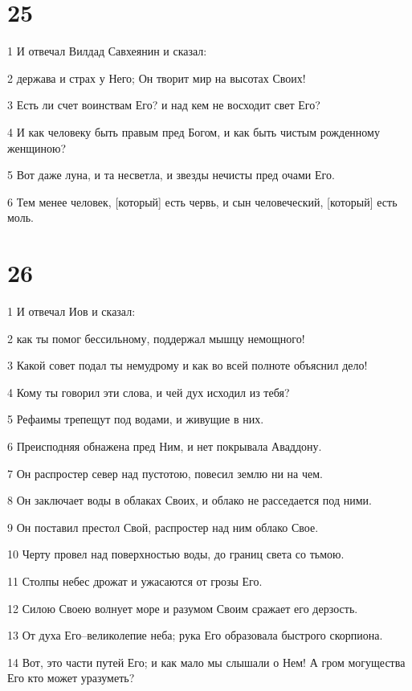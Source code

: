 \chapter{25}

\par 1 И отвечал Вилдад Савхеянин и сказал:
\par 2 держава и страх у Него; Он творит мир на высотах Своих!
\par 3 Есть ли счет воинствам Его? и над кем не восходит свет Его?
\par 4 И как человеку быть правым пред Богом, и как быть чистым рожденному женщиною?
\par 5 Вот даже луна, и та несветла, и звезды нечисты пред очами Его.
\par 6 Тем менее человек, [который] есть червь, и сын человеческий, [который] есть моль.

\chapter{26}

\par 1 И отвечал Иов и сказал:
\par 2 как ты помог бессильному, поддержал мышцу немощного!
\par 3 Какой совет подал ты немудрому и как во всей полноте объяснил дело!
\par 4 Кому ты говорил эти слова, и чей дух исходил из тебя?
\par 5 Рефаимы трепещут под водами, и живущие в них.
\par 6 Преисподняя обнажена пред Ним, и нет покрывала Аваддону.
\par 7 Он распростер север над пустотою, повесил землю ни на чем.
\par 8 Он заключает воды в облаках Своих, и облако не расседается под ними.
\par 9 Он поставил престол Свой, распростер над ним облако Свое.
\par 10 Черту провел над поверхностью воды, до границ света со тьмою.
\par 11 Столпы небес дрожат и ужасаются от грозы Его.
\par 12 Силою Своею волнует море и разумом Своим сражает его дерзость.
\par 13 От духа Его--великолепие неба; рука Его образовала быстрого скорпиона.
\par 14 Вот, это части путей Его; и как мало мы слышали о Нем! А гром могущества Его кто может уразуметь?

